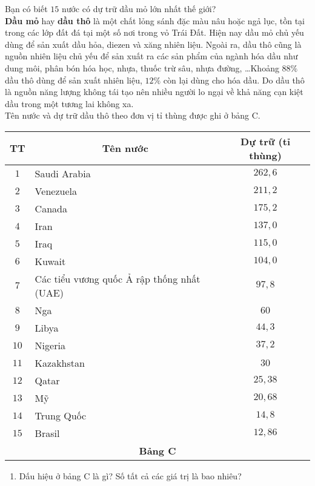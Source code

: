 \begin{bt}%
	Bạn có biết $15$ nước có dự trữ dầu mỏ lớn nhất thế giới?\\
	\textbf{Dầu mỏ} hay \textbf{dầu thô} là một chất lỏng sánh đặc màu nâu hoặc ngả lục, tồn tại trong các lớp đất đá tại một số nơi trong vỏ Trái Đất. Hiện nay dầu mỏ chủ yếu dùng để sản xuất  dầu hỏa, diezen và xăng nhiên liệu. Ngoài ra, dầu thô cũng là nguồn nhiên liệu chủ yếu để sản xuất ra các sản phẩm của ngành hóa dầu như dung môi, phân bón hóa học, nhựa, thuốc trừ sâu, nhựa đường, \ldots Khoảng $88\%$ dầu thô dùng để sản xuất nhiên liệu, $12\%$ còn lại dùng cho hóa dầu. Do dầu thô là nguồn năng lượng không tái tạo nên nhiều người lo ngại về khả năng cạn kiệt dầu trong một tương lai không xa.\\
	Tên nước và dự trữ dầu thô theo đơn vị tỉ thùng được ghi ở bảng C.
	\begin{center}
		\begin{tabular}{|c|l|c|}
			\hline
			TT &\multicolumn{1}{c|}{Tên nước} &Dự trữ (tỉ thùng)\\
			\hline
			$1$ &Saudi Arabia &$262,6$\\
			\hline
			$2$ &Venezuela &$211,2$\\
			\hline
			$3$ &Canada &$175,2$\\
			\hline
			$4$ &Iran &$137,0$\\
			\hline
			$5$ &Iraq &$115,0$\\
			\hline
			$6$ &Kuwait &$104,0$\\
			\hline
			$7$ &Các tiểu vương quốc Ả rập thống nhất (UAE) &$97,8$\\
			\hline
			$8$ &Nga &$60$\\
			\hline
			$9$ &Libya &$44,3$\\
			\hline
			$10$ &Nigeria &$37,2$\\
			\hline
			$11$ &Kazakhstan &$30$\\
			\hline
			$12$ &Qatar &$25,38$\\
			\hline
			$13$ &Mỹ &$20,68$\\
			\hline
			$14$ &Trung Quốc &$14,8$\\
			\hline
			$15$ &Brasil &$12,86$\\
			\hline
			\multicolumn{3}{c}{\textbf{Bảng C}}
		\end{tabular}
	\end{center}
	\begin{enumerate}
		\item Dấu hiệu ở bảng C là gì? Số tất cả các giá trị là bao nhiêu?

\end{enumerate}
\end{bt}

